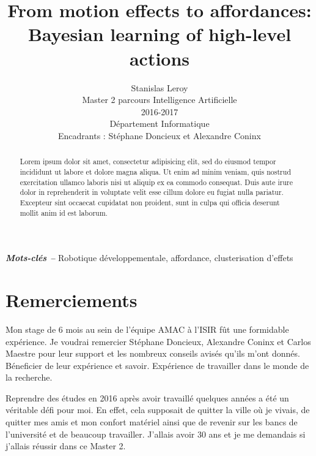 \documentclass{llncs}
\providecommand{\keywords}[1]{\textbf{\textit{Mots-clés --}} #1}
\begin{document}
\title{From motion effects to affordances: Bayesian learning of high-level actions}

\author{Stanislas Leroy\\
   Master 2 parcours Intelligence Artificielle\\
   2016-2017\\
   Département Informatique\\
   Encadrants : Stéphane Doncieux et Alexandre Coninx}

\maketitle


\begin{abstract}
Lorem ipsum dolor sit amet, consectetur adipisicing elit, sed do eiusmod tempor incididunt ut labore et dolore magna aliqua. Ut enim ad minim veniam, quis nostrud exercitation ullamco laboris nisi ut aliquip ex ea commodo consequat. Duis aute irure dolor in reprehenderit in voluptate velit esse cillum dolore eu fugiat nulla pariatur. Excepteur sint occaecat cupidatat non proident, sunt in culpa qui officia deserunt mollit anim id est laborum.
\end{abstract}

\keywords{Robotique développementale, affordance, clusterisation d'effets}


\section*{Remerciements}

Mon stage de 6 mois au sein de l'équipe AMAC à l'ISIR fût une formidable expérience. Je voudrai remercier Stéphane Doncieux, Alexandre Coninx et Carlos Maestre pour leur support et les nombreux conseils avisés qu'ils m'ont donnés.
Béneficier de leur expérience et savoir. Expérience de travailler dans le monde de la recherche.

Reprendre des études en 2016 après avoir travaillé quelques années a été un véritable défi pour moi. En effet, cela supposait de quitter la ville où je vivais, de quitter mes amis et mon confort matériel ainsi que de revenir sur les bancs de l'université et de beaucoup travailler. J'allais avoir 30 ans et je me demandais si j'allais réussir dans ce Master 2.
\end{document}
